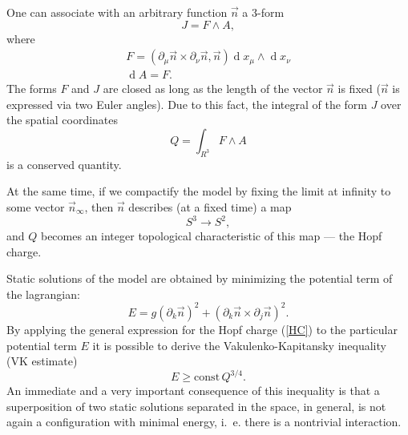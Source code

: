 \documentclass[a4paper,12pt]{article}
\DeclareMathOperator{\dd}{d}
\newcommand{\prm}{\partial_{\mu}}
\newcommand{\prn}{\partial_{\nu}}
\newcommand{\prj}{\partial_{j}}
\newcommand{\prk}{\partial_{k}}
\begin{document}
        One can associate with an arbitrary function 
    $ \vec{n} $ 
        a  3-form
\begin{equation}
    J = F \wedge A ,
\end{equation}
        where
\begin{gather}
    F = (\prm \vec{n} \times \prn \vec{n} , \vec{n}) \dd x_{\mu} 
        \wedge \dd x_{\nu}
\\
    \dd A = F .
\end{gather}
        The forms 
    $ F $ and 
    $ J $
        are closed as long as the length of the vector
    $ \vec{n} $ 
        is fixed 
    ($ \vec{n} $ 
        is expressed via two Euler angles).
        Due to this fact, the integral of the form
    $ J $
	over the spatial coordinates
\begin{equation}
\label{HC}
    Q = \int_{R^{3}} F \wedge A
\end{equation}
        is a conserved quantity.

        At the same time, if we compactify the model by fixing
        the limit 
        at infinity to some vector
    $ \vec{n}_{\infty} $,
        then
    $ \vec{n} $ 
        describes (at a fixed time) a map
\begin{equation}
    S^{3} \to S^{2} ,
\end{equation}
        and 
    $ Q $
        becomes an integer topological characteristic of this map ---
        the Hopf charge.

        Static solutions of the model are obtained by minimizing
        the potential term of the lagrangian:
\begin{equation}
    E = g (\prk \vec{n})^{2} + (\prk \vec{n} \times \prj \vec{n})^{2} .
\end{equation}
        By applying the general expression for the Hopf charge 
(\ref{HC})
        to the particular potential term 
    $ E $
        it is possible to derive the Vakulenko-Kapitansky inequality
        (VK estimate)
\begin{equation}
\label{VK}
    E \ge \text{const} \, Q^{3/4}.
\end{equation}
        An immediate and a very important consequence of this inequality
        is that a superposition of two static solutions separated
        in the space, in general, is not again a configuration
        with minimal energy, i.~e. there is a nontrivial interaction.
\end{document}

